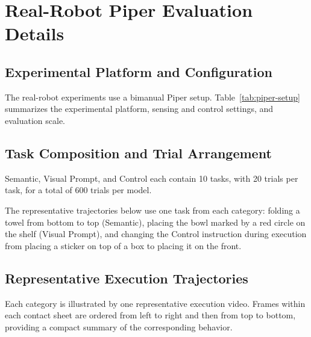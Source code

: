 \section{Real-Robot Piper Evaluation Details}
\label{appendix:real-robot-piper}

\subsection{Experimental Platform and Configuration}
\label{app:piper-platform}

The real-robot experiments use a bimanual Piper setup. Table~\ref{tab:piper-setup}
summarizes the experimental platform, sensing and control settings, and evaluation scale.

%

\subsection{Task Composition and Trial Arrangement}
\label{app:piper-tasks}

Semantic, Visual Prompt, and Control each contain 10 tasks, with 20 trials per
task, for a total of 600 trials per model.

The representative trajectories below use one task from each category:
folding a towel from bottom to top (Semantic), placing the bowl marked by a
red circle on the shelf (Visual Prompt), and changing the Control instruction
during execution from placing a sticker on top of a box to placing it on
the front. 

\subsection{Representative Execution Trajectories}
\label{app:piper-trajectories}

Each category is illustrated by one representative execution video. Frames
within each contact sheet are ordered from left to right and then from top
to bottom, providing a compact summary of the corresponding behavior.

%

